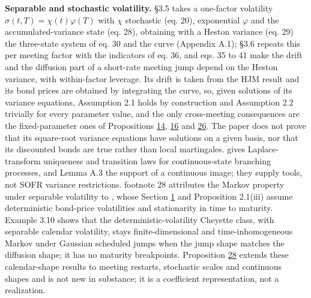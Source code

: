 \documentclass[11pt]{article}
\begin{document}
\textbf{Separable and stochastic volatility.} \cite{brace2024sofr} §3.5 takes a one-factor volatility \(\sigma(t, T) = \chi(t)\varphi(T)\) with \(\chi\) stochastic (eq. 20), exponential \(\varphi\) and the accumulated-variance state (eq. 28), obtaining with a Heston variance (eq. 29) the three-state system of eq. 30 and the curve (Appendix A.1); §3.6 repeats this per meeting factor with the indicators of eq. 36, and eqs. 35 to 41 make the drift and the diffusion part of a short-rate meeting jump depend on the Heston variance, with within-factor leverage. Its drift is taken from the HJM result and its bond prices are obtained by integrating the curve, so, given solutions of its variance equations, Assumption 2.1 holds by construction and Assumption 2.2 trivially for every parameter value, and the only cross-meeting consequences are the fixed-parameter ones of Propositions \hyperref[res:Proposition-14]{14}, \hyperref[res:Proposition-16]{16} and \hyperref[res:Proposition-26]{26}. The paper does not prove that its square-root variance equations have solutions on a given basis, nor that its discounted bonds are true rather than local martingales. \cite{li2019continuous} gives Laplace-transform uniqueness and transition laws for continuous-state branching processes, and \cite{fontana2025extended} Lemma A.3 the support of a continuous image; they supply tools, not SOFR variance restrictions. \cite{brace2024sofr} footnote 28 attributes the Markov property under separable volatility to \cite{carverhill1994when}, whose Section \hyperref[sec:1]{1} and Proposition 2.1(iii) assume deterministic bond-price volatilities and stationarity in time to maturity. \cite{fontana2022term} Example 3.10 shows that the deterministic-volatility Cheyette class, with separable calendar volatility, stays finite-dimensional and time-inhomogeneous Markov under Gaussian scheduled jumps when the jump shape matches the diffusion shape; it has no maturity breakpoints. Proposition \hyperref[res:Proposition-28]{28} extends these calendar-shape results to meeting restarts, stochastic scales and continuous shapes and is not new in substance; it is a coefficient representation, not a realization.
\end{document}
